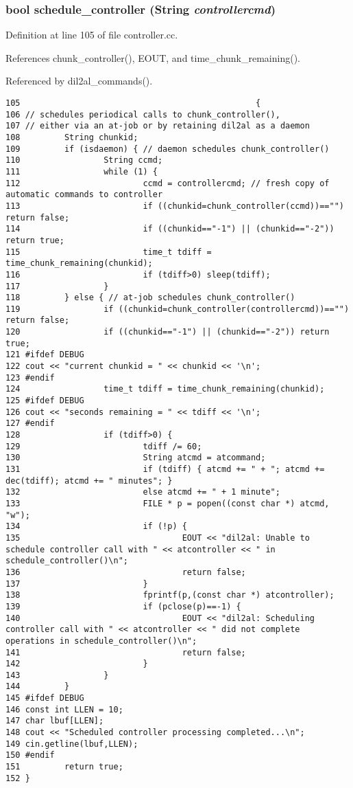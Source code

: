 \subsubsection{\setlength{\rightskip}{0pt plus 5cm}bool schedule\_\-controller ({\bf String} {\em controllercmd})}\label{dil2al_8hh_a341}




Definition at line 105 of file controller.cc.

References chunk\_\-controller(), EOUT, and time\_\-chunk\_\-remaining().

Referenced by dil2al\_\-commands().



\footnotesize\begin{verbatim}105                                                {
106 // schedules periodical calls to chunk_controller(),
107 // either via an at-job or by retaining dil2al as a daemon
108         String chunkid;
109         if (isdaemon) { // daemon schedules chunk_controller()
110                 String ccmd;
111                 while (1) {
112                         ccmd = controllercmd; // fresh copy of automatic commands to controller
113                         if ((chunkid=chunk_controller(ccmd))=="") return false;
114                         if ((chunkid=="-1") || (chunkid=="-2")) return true;
115                         time_t tdiff = time_chunk_remaining(chunkid);
116                         if (tdiff>0) sleep(tdiff);
117                 }
118         } else { // at-job schedules chunk_controller()
119                 if ((chunkid=chunk_controller(controllercmd))=="") return false;
120                 if ((chunkid=="-1") || (chunkid=="-2")) return true;
121 #ifdef DEBUG
122 cout << "current chunkid = " << chunkid << '\n';
123 #endif
124                 time_t tdiff = time_chunk_remaining(chunkid);
125 #ifdef DEBUG
126 cout << "seconds remaining = " << tdiff << '\n';
127 #endif
128                 if (tdiff>0) {
129                         tdiff /= 60;
130                         String atcmd = atcommand;
131                         if (tdiff) { atcmd += " + "; atcmd += dec(tdiff); atcmd += " minutes"; }
132                         else atcmd += " + 1 minute";
133                         FILE * p = popen((const char *) atcmd, "w");
134                         if (!p) {
135                                 EOUT << "dil2al: Unable to schedule controller call with " << atcontroller << " in schedule_controller()\n";
136                                 return false;
137                         }
138                         fprintf(p,(const char *) atcontroller);
139                         if (pclose(p)==-1) {
140                                 EOUT << "dil2al: Scheduling controller call with " << atcontroller << " did not complete operations in schedule_controller()\n";
141                                 return false;
142                         }
143                 }
144         }
145 #ifdef DEBUG
146 const int LLEN = 10;
147 char lbuf[LLEN];
148 cout << "Scheduled controller processing completed...\n";
149 cin.getline(lbuf,LLEN);
150 #endif
151         return true;
152 }
\end{verbatim}\normalsize 
{}

